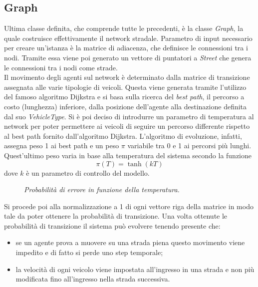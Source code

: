 \documentclass[12pt,a4paper]{report}
\begin{document}
\subsection{Graph}
Ultima classe definita, che comprende tutte le precedenti, è la classe \emph{Graph}, la quale costruisce effettivamente il network stradale.
Parametro di input necessario per creare un'istanza è la matrice di adiacenza, che definisce le connessioni tra i nodi.
Tramite essa viene poi generato un vettore di puntatori a \emph{Street} che genera le connessioni tra i nodi come strade.\\
Il movimento degli agenti sul network è determinato dalla matrice di transizione assegnata alle varie tipologie di veicoli.
Questa viene generata tramite l'utilizzo del famoso algoritmo Dijkstra \cite{dijkstra} e si basa sulla ricerca del \emph{best path}, il percorso a costo (lunghezza) inferiore, dalla posizione dell'agente alla destinazione definita dal suo \emph{VehicleType}.
Si è poi deciso di introdurre un parametro di temperatura al network per poter permettere ai veicoli di seguire un percorso differente rispetto al best path fornito dall'algoritmo Dijkstra.
L'algoritmo di evoluzione, infatti, assegna peso 1 ai best path e un peso $\pi$ variabile tra 0 e 1 ai percorsi più lunghi.
Quest'ultimo peso varia in base alla temperatura del sistema secondo la funzione
\begin{equation}
    \pi(T)=\tanh(kT)
\end{equation}
dove $k$ è un parametro di controllo del modello.
\begin{figure}[H]
    \centering
    \caption[Temperatura nel modello]{\emph{Probabilità di errore in funzione della temperatura.}}
    \label{figure:temperature}
\end{figure}
Si procede poi alla normalizzazione a 1 di ogni vettore riga della matrice in modo tale da poter ottenere la probabilità di transizione.
Una volta ottenute le probabilità di transizione il sistema può evolvere tenendo presente che:
\begin{itemize}
    \item se un agente prova a muovere su una strada piena questo movimento viene impedito e di fatto si perde uno step temporale;
    \item la velocità di ogni veicolo viene impostata all'ingresso in una strada e non più modificata fino all'ingresso nella strada successiva. 
\end{itemize}
\end{document}
